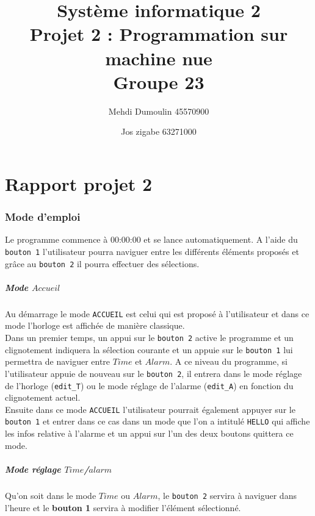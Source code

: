 \documentclass{article}
\title{Système informatique 2 \\ Projet 2 : Programmation sur machine nue \\ Groupe 23}
\author{Mehdi Dumoulin 45570900 \and Jos zigabe 63271000}
\begin{document}
\maketitle
\tableofcontents %
\newpage %

\part*{Rapport projet 2}
	\section{Mode d'emploi}

	Le programme commence à 00:00:00 et se lance automatiquement.
A l'aide du \texttt{bouton 1}  l'utilisateur pourra naviguer entre les différents éléments proposés et grâce au \texttt{bouton 2} il pourra effectuer des sélections.\\
	
	\subsubsection*{Mode $Accueil$} 
Au démarrage le mode \texttt{ACCUEIL} est celui qui est proposé à l'utilisateur et dans ce mode l'horloge est affichée de manière classique.\\

Dans un premier temps, un appui sur le \texttt{bouton 2} active le programme et un clignotement indiquera la sélection courante et un appuie sur le \texttt{bouton 1} lui permettra de naviguer entre $Time$ et $Alarm$. A ce niveau du programme, si l'utilisateur appuie de nouveau sur le \texttt{bouton 2}, il entrera dans le mode réglage de l'horloge (\texttt{edit\_T}) ou le mode réglage de l'alarme (\texttt{edit\_A}) en fonction du clignotement actuel. \\
	Ensuite dans ce mode \texttt{ACCUEIL} l'utilisateur pourrait également appuyer sur le \texttt{bouton 1} et entrer dans ce cas dans un mode que l'on a intitulé \texttt{HELLO} qui affiche les infos relative à l'alarme et un appui sur l'un des deux boutons quittera ce mode. 
	
	\subsubsection*{Mode réglage $Time$/$alarm$} 
Qu'on soit dans le mode $Time$ ou $Alarm$, le \texttt{bouton 2} servira à naviguer dans l'heure et le  \textbf{bouton 1} servira à modifier l'élément sélectionné.\\
\end{document}
